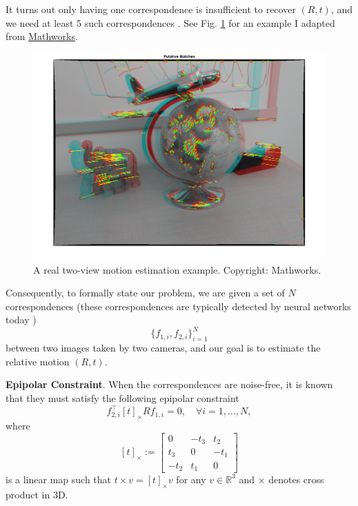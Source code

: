 \documentclass[
]{book}
\theoremstyle{definition}
\theoremstyle{definition}
\theoremstyle{definition}
\theoremstyle{definition}
\theoremstyle{remark}
\begin{document}
It turns out only having one correspondence is insufficient to recover \((R,t)\), and we need at least \(5\) such correspondences \citep{nister04pami-efficient}. See Fig. \ref{fig:two-view-example} for an example I adapted from \href{https://www.mathworks.com/help/vision/ref/estimateessentialmatrix.html}{Mathworks}.

\begin{figure}

{\centering \includegraphics[width=0.8\linewidth]{images/two_view_example_matlab} 

}

\caption{A real two-view motion estimation example. Copyright: Mathworks.}\label{fig:two-view-example}
\end{figure}

Consequently, to formally state our problem, we are given a set of \(N\) correspondences (these correspondences are typically detected by neural networks today \citep{wang20eccv-caps})
\[
\{f_{1,i},f_{2,i} \}_{i=1}^N
\]
between two images taken by two cameras, and our goal is to estimate the relative motion \((R,t)\).

\textbf{Epipolar Constraint}. When the correspondences are noise-free, it is known that they must satisfy the following epipolar constraint \citep{hartley03book-multiple}
\begin{equation}
f_{2,i}^\top[t]_{\times} R f_{1,i} = 0, \quad \forall i=1,\dots,N,
\label{eq:epipolar-constraint}
\end{equation}
where
\[
[t]_{\times} := \begin{bmatrix} 0 & - t_3 & t_2 \\
t_3 & 0 & - t_1 \\
- t_2 & t_1 & 0 \end{bmatrix}
\]
is a linear map such that \(t \times v = [t]_{\times} v\) for any \(v \in \mathbb{R}^{3}\) and \(\times\) denotes cross product in 3D.
\end{document}
